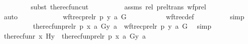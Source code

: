 \begin{isabellebody}
\ \ \ \ \ \ \ \ \isamarkupfalse%
{\isacharparenleft}{\kern0pt}subst\ the{\isacharunderscore}{\kern0pt}recfun{\isacharunderscore}{\kern0pt}cut{\isacharparenright}{\kern0pt}\isanewline
\ \ \ \ \ \ \ \ \isamarkupfalse%
\ assms\ rel\ prel{\isacharunderscore}{\kern0pt}trans\ wf{\isacharunderscore}{\kern0pt}prel\isanewline
\ \ \ \ \ \ \ \ \isamarkupfalse%
\ auto\ \isanewline
\ \ \ \ \ \ \isamarkupfalse%
\ \isamarkupfalse%
\ {\isachardoublequoteopen}{\isachardot}{\kern0pt}{\isachardot}{\kern0pt}{\isachardot}{\kern0pt}\ {\isacharequal}{\kern0pt}\ wftrec{\isacharparenleft}{\kern0pt}prel{\isacharparenleft}{\kern0pt}r{\isacharcomma}{\kern0pt}\ p{\isacharparenright}{\kern0pt}{\isacharcomma}{\kern0pt}\ {\isacharless}{\kern0pt}y{\isacharcomma}{\kern0pt}\ a{\isachargreater}{\kern0pt}{\isacharcomma}{\kern0pt}\ G{\isacharparenright}{\kern0pt}{\isachardoublequoteclose}\ \isanewline
\ \ \ \ \ \ \ \ \isamarkupfalse%
\ wftrec{\isacharunderscore}{\kern0pt}def\isanewline
\ \ \ \ \ \ \ \ \isamarkupfalse%
\ simp\ \isanewline
\ \ \ \ \ \ \isamarkupfalse%
\ \isamarkupfalse%
\ {\isachardoublequoteopen}the{\isacharunderscore}{\kern0pt}recfun{\isacharparenleft}{\kern0pt}prel{\isacharparenleft}{\kern0pt}r{\isacharcomma}{\kern0pt}\ p{\isacharparenright}{\kern0pt}{\isacharcomma}{\kern0pt}\ {\isacharless}{\kern0pt}x{\isacharcomma}{\kern0pt}\ a{\isachargreater}{\kern0pt}{\isacharcomma}{\kern0pt}\ G{\isacharparenright}{\kern0pt}{\isacharbackquote}{\kern0pt}{\isacharless}{\kern0pt}y{\isacharcomma}{\kern0pt}\ a{\isachargreater}{\kern0pt}\ {\isacharequal}{\kern0pt}\ wftrec{\isacharparenleft}{\kern0pt}prel{\isacharparenleft}{\kern0pt}r{\isacharcomma}{\kern0pt}\ p{\isacharparenright}{\kern0pt}{\isacharcomma}{\kern0pt}\ {\isacharless}{\kern0pt}y{\isacharcomma}{\kern0pt}\ a{\isachargreater}{\kern0pt}{\isacharcomma}{\kern0pt}\ G{\isacharparenright}{\kern0pt}{\isachardoublequoteclose}\ \isamarkupfalse%
\ simp\isanewline
\isanewline
\ \ \ \ \ \ \isamarkupfalse%
\ \isamarkupfalse%
\ {\isachardoublequoteopen}the{\isacharunderscore}{\kern0pt}recfun{\isacharparenleft}{\kern0pt}r{\isacharcomma}{\kern0pt}\ x{\isacharcomma}{\kern0pt}\ H{\isacharparenright}{\kern0pt}{\isacharbackquote}{\kern0pt}y\ {\isacharequal}{\kern0pt}\ the{\isacharunderscore}{\kern0pt}recfun{\isacharparenleft}{\kern0pt}prel{\isacharparenleft}{\kern0pt}r{\isacharcomma}{\kern0pt}\ p{\isacharparenright}{\kern0pt}{\isacharcomma}{\kern0pt}\ {\isacharless}{\kern0pt}x{\isacharcomma}{\kern0pt}\ a{\isachargreater}{\kern0pt}{\isacharcomma}{\kern0pt}\ G{\isacharparenright}{\kern0pt}{\isacharbackquote}{\kern0pt}{\isacharless}{\kern0pt}y{\isacharcomma}{\kern0pt}\ a{\isachargreater}{\kern0pt}{\isachardoublequoteclose}\ \isanewline

\end{isabellebody}
